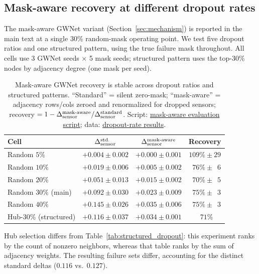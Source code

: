 \subsection{Mask-aware recovery at different dropout rates}
\label{sec:appendix_mask_aware_sweep}

The mask-aware GWNet variant (Section~\ref{sec:mechanism}) is reported in
the main text at a single 30\% random-mask operating point. We test five dropout ratios and one structured pattern,
using the true failure mask throughout. All cells use 3 GWNet seeds
$\times$ 5 mask seeds; structured pattern uses the top-30\% nodes by
adjacency degree (one mask per seed).

\begin{table}[h]
\centering
\small
\caption{Mask-aware GWNet recovery is stable across dropout ratios and
structured patterns. ``Standard'' = silent zero-mask; ``mask-aware'' =
adjacency rows/cols zeroed and renormalized for dropped sensors;
recovery $= 1 - \Delta_{\text{sensor}}^{\text{mask-aware}}/\Delta_{\text{sensor}}^{\text{standard}}$.
Script: \href{https://github.com/sirjuststop/stgnn-shift-bench/blob/main/experiments/mask_aware_dropout_sweep.py}{mask-aware evaluation script};
data: \href{https://github.com/sirjuststop/stgnn-shift-bench/blob/main/results/polish_v15/mask_aware_ratio_sweep.json}{dropout-rate results}.}
\label{tab:mask_aware_sweep}
\vskip 0.05in
\begin{tabular}{lccc}
\toprule
\textbf{Cell} & \textbf{$\Delta_{\text{sensor}}^{\text{std.}}$} & \textbf{$\Delta_{\text{sensor}}^{\text{mask-aware}}$} & \textbf{Recovery} \\
\midrule
Random $5\%$        & $+0.004 \pm 0.002$ & $+0.000 \pm 0.001$ & $109\% \pm 29$ \\
Random $10\%$       & $+0.019 \pm 0.006$ & $+0.005 \pm 0.002$ & $\phantom{0}76\% \pm \phantom{0}6$ \\
Random $20\%$       & $+0.051 \pm 0.013$ & $+0.015 \pm 0.002$ & $\phantom{0}70\% \pm \phantom{0}5$ \\
Random $30\%$ (main) & $+0.092 \pm 0.030$ & $+0.023 \pm 0.009$ & $\phantom{0}75\% \pm \phantom{0}3$ \\
Random $40\%$       & $+0.145 \pm 0.026$ & $+0.035 \pm 0.006$ & $\phantom{0}75\% \pm \phantom{0}3$ \\
\midrule
Hub-30\% (structured) & $+0.116 \pm 0.037$ & $+0.034 \pm 0.001$ & $\phantom{0}71\%$ \\
\bottomrule
\end{tabular}
\par\vskip 0.03in
{\footnotesize Hub selection differs from Table~\ref{tab:structured_dropout}:
this experiment ranks by the count of nonzero neighbors, whereas that table ranks
by the sum of adjacency weights. The resulting failure sets differ, accounting
for the distinct standard deltas ($0.116$ vs.\ $0.127$).}
\end{table}

